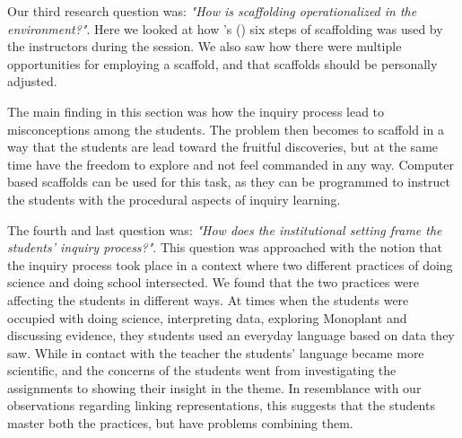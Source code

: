 
Our third research question was: \emph{"How is scaffolding operationalized in the environment?"}. Here we looked at how \citeauthor{wood1976role}'s (\citeyear{wood1976role}) six steps of scaffolding was used by the instructors during the session. We also saw how there were multiple opportunities for employing a scaffold, and that scaffolds should be personally adjusted. 

The main finding in this section was how the inquiry process lead to misconceptions among the students. The problem then becomes to scaffold in a way that the students are lead toward the fruitful discoveries, but at the same time have the freedom to explore and not feel commanded in any way. Computer based scaffolds can be used for this task, as they can be programmed to instruct the students with the procedural aspects of inquiry learning. 

The fourth and last question was: \emph{"How does the institutional setting frame the students' inquiry process?"}. This question was approached with the notion that the inquiry process took place in a context where two different practices of doing science and doing school intersected. We found that the two practices were affecting the students in different ways. At times when the students were occupied with doing science, interpreting data, exploring Monoplant and discussing evidence, they students used an everyday language based on data they saw. While in contact with the teacher the students' language became more scientific, and the concerns of the students went from investigating the assignments to showing their insight in the theme. In resemblance with our observations regarding linking representations, this suggests that the students master both the practices, but have problems combining them.
